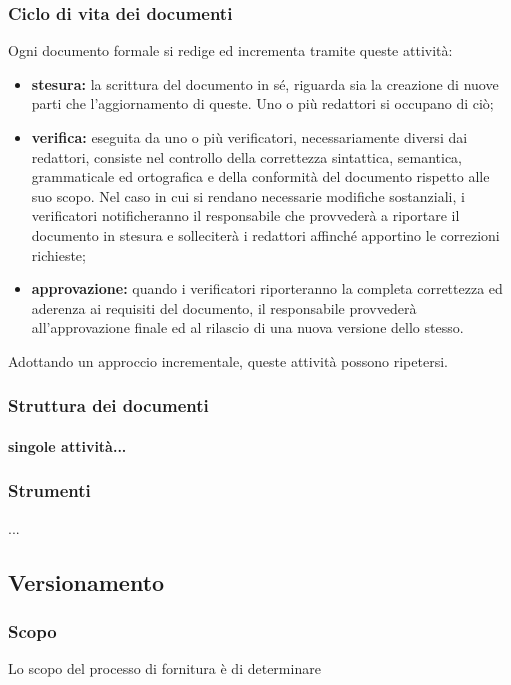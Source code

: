     \subsubsection{Ciclo di vita dei documenti}
        Ogni documento formale si redige ed incrementa tramite queste attività:
        \begin{itemize}
            \item \textbf{stesura: }la scrittura del documento in sé, riguarda sia la creazione di nuove parti che l'aggiornamento di queste. Uno o più redattori si occupano di ciò;
            \item \textbf{verifica: }eseguita da uno o più verificatori, necessariamente diversi dai redattori, consiste nel controllo della correttezza sintattica, semantica, grammaticale ed ortografica e della conformità del documento rispetto alle suo scopo. Nel caso in cui si rendano necessarie modifiche sostanziali, i verificatori notificheranno il responsabile che provvederà a riportare il documento in stesura e solleciterà i redattori affinché apportino le correzioni richieste;
            \item \textbf{approvazione: }quando i verificatori riporteranno la completa correttezza ed aderenza ai requisiti del documento, il responsabile provvederà all'approvazione finale ed al rilascio di una nuova versione dello stesso.
        \end{itemize}
        Adottando un approccio incrementale, queste attività possono ripetersi.
    \subsubsection{Struttura dei documenti}


    \paragraph{singole attività...}
    \subsubsection{Strumenti}
    ...

\subsection{Versionamento} %
    \subsubsection{Scopo}
    Lo scopo del processo di fornitura è di determinare
